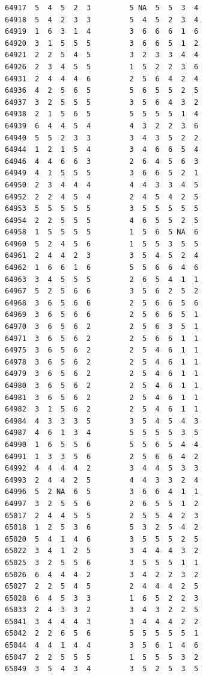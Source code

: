 \documentclass[
  letterpaper,
  DIV=11,
  numbers=noendperiod]{scrreprt}
\begin{document}
\begin{verbatim}
64917  5  4  5  2  3         5 NA  5  5  3  4
64918  5  4  2  3  3         5  4  5  2  3  4
64919  1  6  3  1  4         3  6  6  6  1  6
64920  3  1  5  5  5         3  6  6  5  1  2
64921  2  2  5  4  5         3  2  3  3  4  4
64926  2  3  4  5  5         1  5  2  2  3  6
64931  2  4  4  4  6         2  5  6  4  2  4
64936  4  2  5  6  5         5  6  5  5  2  5
64937  3  2  5  5  5         3  5  6  4  3  2
64938  2  1  5  6  5         5  5  5  5  1  4
64939  6  4  4  5  4         4  3  2  2  3  6
64940  5  5  2  3  3         3  4  3  5  2  2
64944  1  2  1  5  4         3  4  6  6  5  4
64946  4  4  6  6  3         2  6  4  5  6  3
64949  4  1  5  5  5         3  6  6  5  2  1
64950  2  3  4  4  4         4  4  3  3  4  5
64952  2  2  4  5  4         2  4  5  4  2  5
64953  5  5  5  5  5         3  5  5  5  5  5
64954  2  2  5  5  5         4  6  5  5  2  5
64958  1  5  5  5  5         1  5  6  5 NA  6
64960  5  2  4  5  6         1  5  5  3  5  5
64961  2  4  4  2  3         3  5  4  5  2  4
64962  1  6  6  1  6         5  5  6  6  4  6
64963  3  4  5  5  5         2  6  5  4  1  1
64967  5  2  5  6  6         3  5  6  2  5  2
64968  3  6  5  6  6         2  5  6  6  5  6
64969  3  6  5  6  6         2  5  6  6  5  1
64970  3  6  5  6  2         2  5  6  3  5  1
64971  3  6  5  6  2         2  5  6  6  1  1
64975  3  6  5  6  2         2  5  4  6  1  1
64978  3  6  5  6  2         2  5  4  6  1  1
64979  3  6  5  6  2         2  5  4  6  1  1
64980  3  6  5  6  2         2  5  4  6  1  1
64981  3  6  5  6  2         2  5  4  6  1  1
64982  3  1  5  6  2         2  5  4  6  1  1
64984  4  3  3  3  5         3  5  4  5  4  3
64987  4  6  1  3  4         5  5  5  5  3  5
64990  1  6  5  5  6         5  5  6  5  4  4
64991  1  3  3  5  6         2  5  6  6  4  2
64992  4  4  4  4  2         3  4  4  5  3  3
64993  2  4  4  2  5         4  4  3  3  2  4
64996  5  2 NA  6  5         3  6  6  4  1  1
64997  3  2  5  5  6         2  6  5  5  1  2
65017  2  4  4  5  5         2  5  5  4  2  3
65018  1  2  5  3  6         5  3  2  5  4  2
65020  5  4  1  4  6         3  5  5  5  2  5
65022  3  4  1  2  5         3  4  4  4  3  2
65025  3  2  5  5  6         3  5  5  5  1  1
65026  6  4  4  4  2         3  4  2  2  3  2
65027  2  2  5  4  5         2  4  4  4  2  5
65028  6  4  5  3  3         1  6  5  2  2  3
65033  2  4  3  3  2         3  4  3  2  2  5
65041  3  4  4  4  3         3  4  4  4  2  2
65042  2  2  6  5  6         5  5  5  5  5  1
65044  4  4  1  4  4         3  5  6  1  4  6
65047  2  2  5  5  5         1  5  5  5  3  2
65049  3  5  4  3  4         3  5  2  5  3  5

\end{verbatim}
\end{document}
